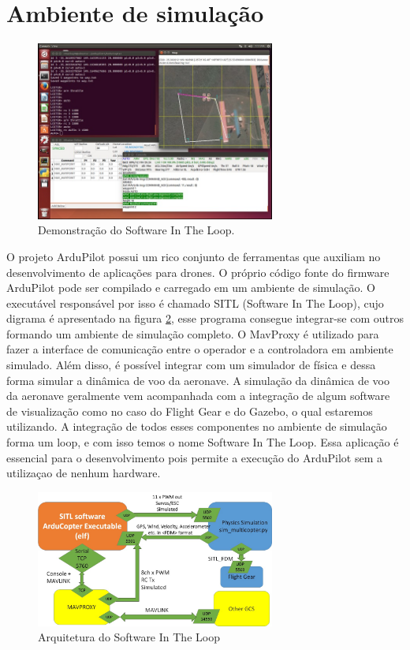 \documentclass[12pt,a4paper,oneside]{book}
\begin{document}
\newpage

\section{Ambiente de simulação}
%
\begin{figure}[!htbp]
  \centering
  \includegraphics[width=0.7\textwidth]{Images/Desenvolvimento/sitl_demo.jpg}
  \caption{Demonstração do Software In The Loop.}
  \label{fig:sitl_demo.jpg.0}
\end{figure}
%

O projeto ArduPilot possui um rico conjunto de ferramentas que auxiliam no desenvolvimento de aplicações para drones. O próprio código fonte do firmware ArduPilot pode ser compilado e carregado em um ambiente de simulação. O executável responsável por isso é chamado SITL (Software In The Loop), cujo digrama é apresentado na figura \ref{fig:sitl_arq.jpg.0}, esse programa consegue integrar-se com outros formando um ambiente de simulação completo. O MavProxy é utilizado para fazer a interface de comunicação entre o operador e a controladora em ambiente simulado. Além disso, é possível integrar com um simulador de física e dessa forma simular a dinâmica de voo da aeronave. A simulação da dinâmica de voo da aeronave geralmente vem acompanhada com a integração de algum software de visualização como no caso do Flight Gear e do Gazebo, o qual estaremos utilizando. A integração de todos esses componentes no ambiente de simulação forma um loop, e com isso temos o nome Software In The Loop. Essa aplicação é essencial para o desenvolvimento pois permite a execução do ArduPilot sem a utilizaçao de nenhum hardware.

%
\begin{figure}[H]
  \centering
  \includegraphics[width=0.7\textwidth]{Images/Diagramas/sitl_arq.jpg}
  \caption{Arquitetura do Software In The Loop}
  \label{fig:sitl_arq.jpg.0}
\end{figure}
%
\end{document}
